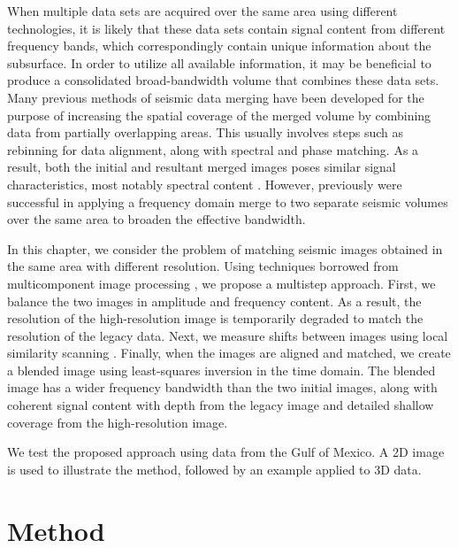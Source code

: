     When multiple data sets are acquired over the same area using different technologies, it is likely that these data sets contain signal content from different frequency bands, which correspondingly contain unique information about the subsurface. 
    In order to utilize all available information, it may be beneficial to produce a consolidated broad-bandwidth volume that combines these data sets.
    Many previous methods of seismic data merging have been developed for the purpose of increasing the spatial coverage of the merged volume by combining data from partially overlapping areas. 
    This usually involves steps such as rebinning for data alignment, along with spectral and phase matching.
    As a result, both the initial and resultant merged images poses similar signal characteristics, most notably spectral content \cite[]{kavery,gabor,supermerge}. 
    However, previously \cite{freqmerge} were successful in applying a frequency domain merge to two separate seismic volumes over the same area to broaden the effective bandwidth.
    
    In this chapter, we consider the problem of matching seismic images obtained in the same area with different resolution. 
    Using techniques borrowed from multicomponent image processing \cite[]{warp}, we propose a multistep approach. 
    First, we balance the two images in amplitude and frequency content. 
    As a result, the resolution of the high-resolution image is temporarily degraded to match the resolution of the legacy data. 
    Next, we measure shifts between images using local similarity scanning \cite[]{attr,timelapse}.
    Finally, when the images are aligned and matched, we create a blended image using least-squares inversion in the time domain. 
    The blended image has a wider frequency bandwidth than the two initial images, along with coherent signal content with depth from the legacy image and detailed shallow coverage from the high-resolution image. 
    
    We test the proposed approach using data from the Gulf of Mexico. 
    A 2D image is used to illustrate the method, followed by an example applied to 3D data.


\section{Method}
    
